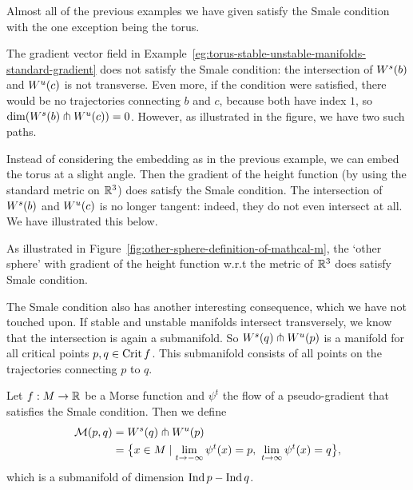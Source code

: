     Almost all of the previous examples we have given satisfy the Smale condition with the one exception being the torus.
    \begin{noneg}
        The gradient vector field in Example~\ref{eg:torus-stable-unstable-manifolds-standard-gradient} does not satisfy the Smale condition: the intersection of $W^s(b)$ and  $W^u(c)$ is not transverse.
        Even more, if the condition were satisfied, there would be no trajectories connecting $b$ and $c$, because both have index $1$, so $\dim (W^s(b) \pitchfork W^u(c)) = 0$. However, as illustrated in the figure, we have two such paths.
    \end{noneg}
    \begin{eg}
        Instead of considering the embedding as in the previous example, we can embed the torus at a slight angle.
        Then the gradient of the height function (by using the standard metric on $\mathbb{R}^3$) does satisfy the Smale condition.
        The intersection of $W^s(b)$ and  $W^u(c)$ is no longer tangent: indeed, they do not even intersect at all. We have illustrated this below.
        \label{eg:tilted-torus}
    \end{eg}
    \begin{figure}[H]
        \centering
    \end{figure}
    \begin{eg}
        As illustrated in Figure~\ref{fig:other-sphere-definition-of-mathcal-m}, the `other sphere' with gradient of the height function w.r.t the metric of $\mathbb{R}^3$ does satisfy Smale condition.  \end{eg}

The Smale condition also has another interesting consequence, which we have not touched upon.
If stable and unstable manifolds intersect transversely, we know that the intersection is again a submanifold.
So $W^s(q) \pitchfork W^u(p)$ is a manifold for all critical points $p, q \in \operatorname{Crit} f$.
This submanifold consists of all points on the trajectories connecting $p$ to $q$.
 \begin{definition}
    Let $f: M \to  \mathbb{R}$ be a Morse function and $\psi^{t}$ the flow of a pseudo-gradient that satisfies the Smale condition.
    Then we define
    \begin{align*}
        \traj{p}{q} &= \stable{q} \tcap \unstable{p}\\
                    &= \big\{
            x \in M 
            \mid 
            \lim_{t \to -\infty} \psi^{t}(x) = p, \ 
            \lim_{t \to \infty} \psi^{t}(x) = q
        \big\} 
    ,\end{align*} 
    which is a submanifold of dimension $\operatorname{Ind} p - \operatorname{Ind} q$.
\end{definition}

